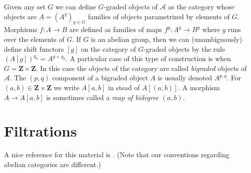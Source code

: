 \medskip\noindent
Given any set $G$ we can define $G$-graded objects of $\mathcal{A}$
as the category whose objects are $A = (A^g)_{g \in G}$
families of objects parametrized by elements of $G$. Morphisms
$f : A \to B$ are defined as families of maps $f^g : A^g \to B^g$
where $g$ runs over the elements of $G$. If $G$ is an abelian group,
then we can (unambiguously) define shift functors $[g]$ on the category
of $G$-graded objects by the rule $(A[g])^{g_0} = A^{g + g_0}$.
A particular case of this type of construction is when
$G = \mathbf{Z} \times \mathbf{Z}$. In this case the objects of
the category are called {\it bigraded} objects of $\mathcal{A}$.
The $(p, q)$ component of a bigraded object $A$ is usually denoted
$A^{p, q}$. For $(a, b) \in \mathbf{Z} \times \mathbf{Z}$ we write
$A[a, b]$ in stead of $A[(a, b)]$.
A morphism $A \to A[a, b]$ is sometimes called a
{\it map of bidegree $(a, b)$}.





\section{Filtrations}
\label{section-filtrations}

\noindent
A nice reference for this material is \cite[Section 1]{HodgeII}.
(Note that our conventions regarding abelian categories are different.)

